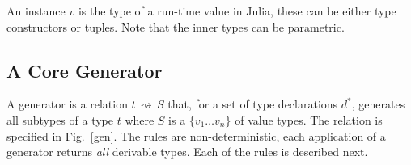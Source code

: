 \documentclass{paper}
\newcommand{\EM}[1]{\ensuremath{#1}\xspace}    %
\newcommand{\Gen}[2]{\EM{#1\,\rightsquigarrow\,#2}}  %
\newcommand{\Set}[1]{\EM{\{ #1\}}}                   %
\newcommand{\m}[1]{\EM{{#1^{*}}}}                     %
\renewcommand{\t}{\EM{t}}                            %
\renewcommand{\v}{\EM{v}}                            %
\renewcommand{\d}{\EM{d}}                            %
\begin{document}
An instance \v is the type of a run-time value in Julia, these can be
either type constructors or tuples. Note that the inner types can be
parametric.


\subsection{A Core Generator}

\newcommand{\RSet}{{\sf GenSet}\xspace}
\newcommand{\RUnion}{{\sf GenUnion}\xspace}
\newcommand{\RTuple}{{\sf GenTuple}\xspace}
\newcommand{\RExists}{{\sf GenExists}\xspace}
\newcommand{\RDeclare}{{\sf GenDeclare}\xspace}

A generator is a relation \Gen\t S that, for a set of type
declarations \m\d, generates all subtypes of a type \t where $S$ is a
\Set{\v_1\dots\v_n} of value types.  The relation is specified in
Fig.~\ref{gen}. The rules are non-deterministic, each application of a
generator returns \emph{all} derivable types. Each of the rules is
described next.

\newcommand{\UnifyGround}[2]{\EM{#1 \cong #2}}
\end{document}
